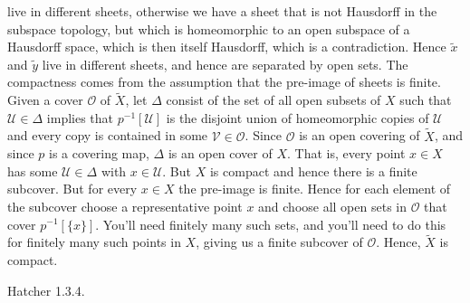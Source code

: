 \documentclass{book}                                                           %
\begin{document}
\begin{solution}
    live in different sheets, otherwise we have a sheet that is not
    Hausdorff in the subspace topology, but which is homeomorphic to an open
    subspace of a Hausdorff space, which is then itself Hausdorff, which is
    a contradiction. Hence $\tilde{x}$ and $\tilde{y}$ live in different
    sheets, and hence are separated by open sets. The compactness comes from
    the assumption that the pre-image of sheets is finite. Given a cover
    $\mathcal{O}$ of $\tilde{X}$, let $\Delta$ consist of the set of all
    open subsets of $X$ such that $\mathcal{U}\in\Delta$ implies that
    $p^{\minus{1}}[\mathcal{U}]$ is the disjoint union of homeomorphic
    copies of $\mathcal{U}$ and every copy is contained in some
    $\mathcal{V}\in\mathcal{O}$. Since $\mathcal{O}$ is an open covering of
    $\tilde{X}$, and since $p$ is a covering map, $\Delta$ is an open cover
    of $X$. That is, every point $x\in{X}$ has some $\mathcal{U}\in\Delta$
    with $x\in\mathcal{U}$. But $X$ is compact and hence there is a finite
    subcover. But for every $x\in{X}$ the pre-image is finite. Hence for
    each element of the subcover choose a representative point $x$ and
    choose all open sets in $\mathcal{O}$ that cover $p^{\minus{1}}[\{x\}]$.
    You'll need finitely many such sets, and you'll need to do this for
    finitely many such points in $X$, giving us a finite subcover of
    $\mathcal{O}$. Hence, $\tilde{X}$ is compact.
\end{solution}
\begin{problem}
    \label{prob:Hatcher_1_3_4}%
    Hatcher 1.3.4.
\end{problem}
\end{document}

